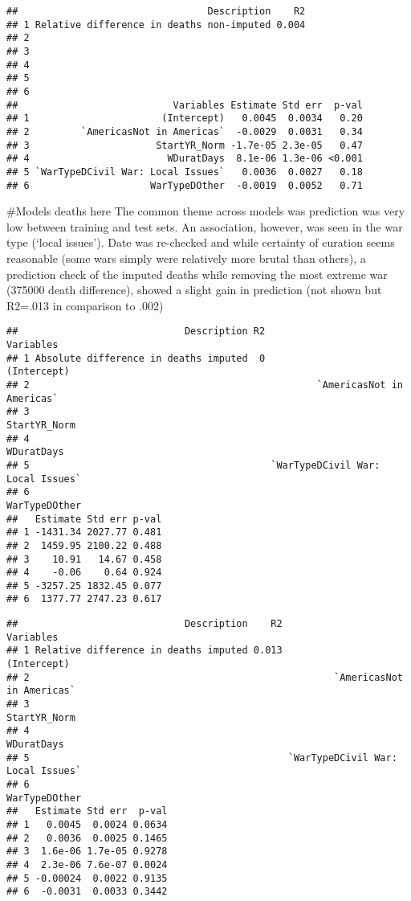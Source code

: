 \documentclass[
]{article}
\begin{document}
\begin{verbatim}
##                                 Description    R2
## 1 Relative difference in deaths non-imputed 0.004
## 2                                                
## 3                                                
## 4                                                
## 5                                                
## 6                                                
##                           Variables Estimate Std err  p-val
## 1                       (Intercept)   0.0045  0.0034   0.20
## 2         `AmericasNot in Americas`  -0.0029  0.0031   0.34
## 3                      StartYR_Norm -1.7e-05 2.3e-05   0.47
## 4                        WDuratDays  8.1e-06 1.3e-06 <0.001
## 5 `WarTypeDCivil War: Local Issues`   0.0036  0.0027   0.18
## 6                     WarTypeDOther  -0.0019  0.0052   0.71
\end{verbatim}

\#Models deaths here The common theme across models was prediction was
very low between training and test sets. An association, however, was
seen in the war type (`local issues'). Date was re-checked and while
certainty of curation seems reasonable (some wars simply were relatively
more brutal than others), a prediction check of the imputed deaths while
removing the most extreme war (375000 death difference), showed a slight
gain in prediction (not shown but R2=.013 in comparison to .002)

\begin{verbatim}
##                             Description R2                         Variables
## 1 Absolute difference in deaths imputed  0                       (Intercept)
## 2                                                  `AmericasNot in Americas`
## 3                                                               StartYR_Norm
## 4                                                                 WDuratDays
## 5                                          `WarTypeDCivil War: Local Issues`
## 6                                                              WarTypeDOther
##   Estimate Std err p-val
## 1 -1431.34 2027.77 0.481
## 2  1459.95 2100.22 0.488
## 3    10.91   14.67 0.458
## 4    -0.06    0.64 0.924
## 5 -3257.25 1832.45 0.077
## 6  1377.77 2747.23 0.617
\end{verbatim}

\begin{verbatim}
##                             Description    R2                         Variables
## 1 Relative difference in deaths imputed 0.013                       (Intercept)
## 2                                                     `AmericasNot in Americas`
## 3                                                                  StartYR_Norm
## 4                                                                    WDuratDays
## 5                                             `WarTypeDCivil War: Local Issues`
## 6                                                                 WarTypeDOther
##   Estimate Std err  p-val
## 1   0.0045  0.0024 0.0634
## 2   0.0036  0.0025 0.1465
## 3  1.6e-06 1.7e-05 0.9278
## 4  2.3e-06 7.6e-07 0.0024
## 5 -0.00024  0.0022 0.9135
## 6  -0.0031  0.0033 0.3442
\end{verbatim}
\end{document}
